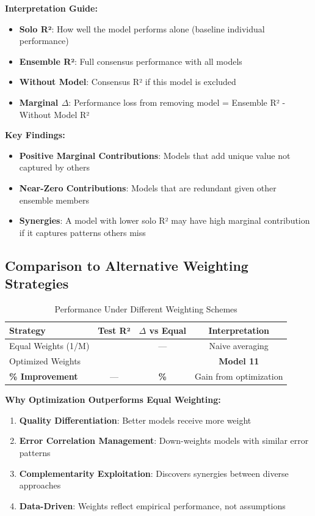 \textbf{Interpretation Guide:}
\begin{itemize}
    \item \textbf{Solo R²}: How well the model performs alone (baseline individual performance)
    \item \textbf{Ensemble R²}: Full consensus performance with all models
    \item \textbf{Without Model}: Consensus R² if this model is excluded
    \item \textbf{Marginal $\Delta$}: Performance loss from removing model = Ensemble R² - Without Model R²
\end{itemize}

\textbf{Key Findings:}
\begin{itemize}
    \item \textbf{Positive Marginal Contributions}: Models that add unique value not captured by others
    \item \textbf{Near-Zero Contributions}: Models that are redundant given other ensemble members
    \item \textbf{Synergies}: A model with lower solo R² may have high marginal contribution if it captures patterns others miss
\end{itemize}

\subsection{Comparison to Alternative Weighting Strategies}

\begin{table}[ht]
\centering
\caption{Performance Under Different Weighting Schemes}
\label{tab:model11_weighting_comparison}
\begin{tabular}{lccc}
\toprule
\textbf{Strategy} & \textbf{Test R²} & \textbf{$\Delta$ vs Equal} & \textbf{Interpretation} \\
\midrule
Equal Weights (1/M) & \ModelElevenEqualWeightRSquared{} & --- & Naive averaging \\
Optimized Weights & \ModelElevenRSquaredTest{} & \ModelElevenImprovementOverEqual{} & \textbf{Model 11} \\
\midrule
\textbf{\% Improvement} & --- & \textbf{\ModelElevenImprovementPct{}\%} & Gain from optimization \\
\bottomrule
\end{tabular}
\end{table}

\textbf{Why Optimization Outperforms Equal Weighting:}
\begin{enumerate}
    \item \textbf{Quality Differentiation}: Better models receive more weight
    \item \textbf{Error Correlation Management}: Down-weights models with similar error patterns
    \item \textbf{Complementarity Exploitation}: Discovers synergies between diverse approaches
    \item \textbf{Data-Driven}: Weights reflect empirical performance, not assumptions
\end{enumerate}

